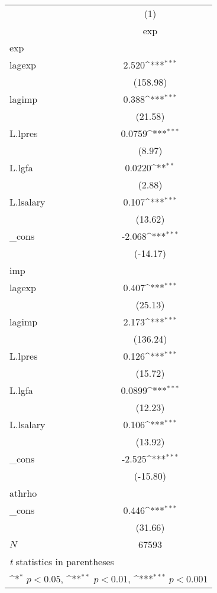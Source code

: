 {
\def\sym#1{\ifmmode^{#1}\else\(^{#1}\)\fi}
\begin{tabular}{l*{1}{c}}
\hline\hline
            &\multicolumn{1}{c}{(1)}\\
            &\multicolumn{1}{c}{exp}\\
\hline
exp         &                     \\
lagexp      &       2.520\sym{***}\\
            &    (158.98)         \\
[1em]
lagimp      &       0.388\sym{***}\\
            &     (21.58)         \\
[1em]
L.lpres     &      0.0759\sym{***}\\
            &      (8.97)         \\
[1em]
L.lgfa      &      0.0220\sym{**} \\
            &      (2.88)         \\
[1em]
L.lsalary   &       0.107\sym{***}\\
            &     (13.62)         \\
[1em]
\_cons      &      -2.068\sym{***}\\
            &    (-14.17)         \\
\hline
imp         &                     \\
lagexp      &       0.407\sym{***}\\
            &     (25.13)         \\
[1em]
lagimp      &       2.173\sym{***}\\
            &    (136.24)         \\
[1em]
L.lpres     &       0.126\sym{***}\\
            &     (15.72)         \\
[1em]
L.lgfa      &      0.0899\sym{***}\\
            &     (12.23)         \\
[1em]
L.lsalary   &       0.106\sym{***}\\
            &     (13.92)         \\
[1em]
\_cons      &      -2.525\sym{***}\\
            &    (-15.80)         \\
\hline
athrho      &                     \\
\_cons      &       0.446\sym{***}\\
            &     (31.66)         \\
\hline
\(N\)       &       67593         \\
\hline\hline
\multicolumn{2}{l}{\footnotesize \textit{t} statistics in parentheses}\\
\multicolumn{2}{l}{\footnotesize \sym{*} \(p<0.05\), \sym{**} \(p<0.01\), \sym{***} \(p<0.001\)}\\
\end{tabular}
}
